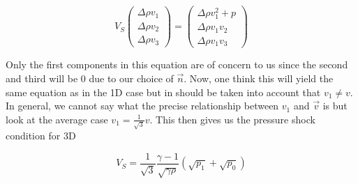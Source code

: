 $$ V_S 
\begin{pmatrix}
\Delta \rho v_1 \\
\Delta \rho v_2 \\
\Delta \rho v_3
\end{pmatrix} 
= 
\begin{pmatrix}
\Delta \rho v^2_1 + p \\
\Delta \rho v_1 v_2 \\
\Delta \rho v_1 v_3
\end{pmatrix} 
$$

Only the first components in this equation are of concern to us since the second and third will be $0$ due to our choice of $\vec{n}$. Now, one think this will yield the same equation as in the 1D case but in should be taken into account that $v_1 \neq v$. In general, we cannot say what the precise relationship between $v_1$ and $\vec{v}$ is but look at the average case $v_1 = \frac{1}{\sqrt{3}} v$. This then gives us the pressure shock condition for 3D

\begin{equation}
\label{eq:p-shock-3D}
V_S = \frac{1}{\sqrt{3}} \frac{\gamma-1}{\sqrt{\gamma \rho}} (\sqrt{p_1} + \sqrt{p_0})
\end{equation}



